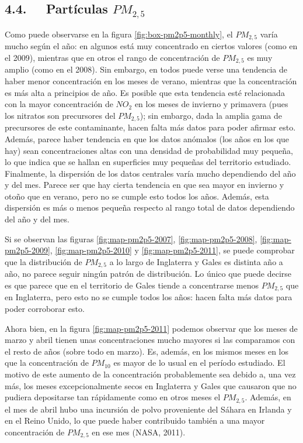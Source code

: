 \documentclass[12pt]{article}
\begin{document}
\subsection*{4.4. $\>$ $\>$ Partículas \textbf{\texorpdfstring{$PM_{2,5}$}{PM2,5}}}
%

Como puede observarse en la figura \ref{fig:box-pm2p5-monthly}, el $PM_{2,5}$ varía mucho según el año: en algunos está muy concentrado en ciertos valores (como en el 2009), mientras que en otros el rango de concentración de $PM_{2,5}$ es muy amplio (como en el 2008). Sin embargo, en todos puede verse una tendencia de haber menor concentración en los meses de verano, mientras que la concentración es más alta a principios de año. Es posible que esta tendencia esté relacionada con la mayor concentración de $NO_{2}$ en los meses de invierno y primavera (pues los nitratos son precursores del $PM_{2,5}$); sin embargo, dada la amplia gama de precursores de este contaminante, hacen falta más datos para poder afirmar esto. Además, parece haber tendencia en que los datos anómalos (los años en los que hay) sean concentraciones altas con una densidad de probabilidad muy pequeña, lo que indica que se hallan en superficies muy pequeñas del territorio estudiado. Finalmente, la dispersión de los datos centrales varía mucho dependiendo del año y del mes. Parece ser que hay cierta tendencia en que sea mayor en invierno y otoño que en verano, pero no se cumple esto todos los años. Además, esta dispersión es más o menos pequeña respecto al rango total de datos dependiendo del año y del mes.

Si se observan las figuras \ref{fig:map-pm2p5-2007}, \ref{fig:map-pm2p5-2008}, \ref{fig:map-pm2p5-2009}, \ref{fig:map-pm2p5-2010} y \ref{fig:map-pm2p5-2011}, se puede comprobar que la distribución de $PM_{2,5}$ a lo largo de Inglaterra y Gales es distinta año a año, no parece seguir ningún patrón de distribución. Lo único que puede decirse es que parece que en el territorio de Gales tiende a concentrarse menos $PM_{2,5}$ que en Inglaterra, pero esto no se cumple todos los años: hacen falta más datos para poder corroborar esto.

Ahora bien, en la figura \ref{fig:map-pm2p5-2011} podemos observar que los meses de marzo y abril tienen unas concentraciones mucho mayores si las comparamos con el resto de años (sobre todo en marzo). Es, además, en los mismos meses en los que la concentración de $PM_{10}$ es mayor de lo usual en el período estudiado. El motivo de este aumento de la concentración probablemente sea debido a, una vez más, los meses excepcionalmente secos en Inglaterra y Gales que causaron que no pudiera depositarse tan rápidamente como en otros meses el $PM_{2,5}$. Además, en el mes de abril hubo una incursión de polvo proveniente del Sáhara en Irlanda y en el Reino Unido, lo que puede haber contribuido también a una mayor concentración de $PM_{2,5}$ en ese mes (NASA, 2011).
\end{document}
